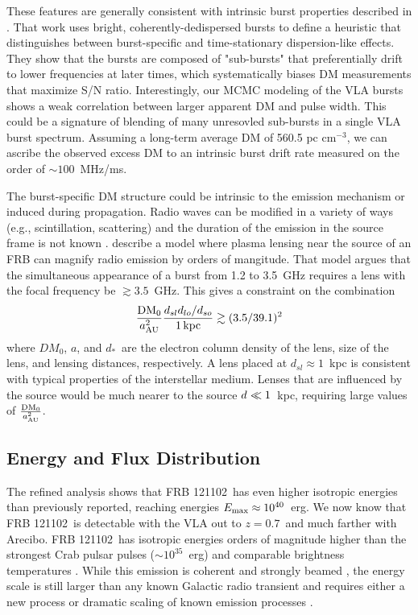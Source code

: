 \documentclass[twocolumn]{aastex61}
\newcommand{\frb}{FRB 121102}
\begin{document}
These features are generally consistent with intrinsic burst properties described in \citet{WEIRD}. That work uses bright, coherently-dedispersed bursts to define a heuristic that distinguishes between burst-specific and time-stationary dispersion-like effects. They show that the bursts are composed of "sub-bursts" that preferentially drift to lower frequencies at later times, which systematically biases DM measurements that maximize S/N ratio. Interestingly, our MCMC modeling of the VLA bursts shows a weak correlation between larger apparent DM and pulse width. This could be a signature of blending of many unresovled sub-bursts in a single VLA burst spectrum. Assuming a long-term average DM of 560.5 pc cm$^{-3}$, we can ascribe the observed excess DM to an intrinsic burst drift rate measured on the order of $\sim100$~MHz/ms.

The burst-specific DM structure could be intrinsic to the emission mechanism or induced during propagation. Radio waves can be modified in a variety of ways (e.g., scintillation, scattering) and the duration of the emission in the source frame is not known \citep{2016arXiv160505890C}. \citet{CORDES} describe a model where plasma lensing near the source of an FRB can magnify radio emission by orders of mangitude. That model argues that the simultaneous appearance of a burst from 1.2 to 3.5~GHz requires a lens with the focal frequency be $\gtrsim 3.5$~GHz. This gives a constraint on the combination 
$$\frac{\rm DM_0}{a_{\rm AU}^2} \frac{d_{sl}d_{lo}/d_{so}}{1\, \rm kpc} \gtrsim (3.5 / 39.1)^2$$
where $DM_0$, $a$, and $d_*$\ are the electron column density of the lens, size of the lens, and lensing distances, respectively. A lens placed at $d_{sl}\approx1$~kpc is consistent with typical properties of the interstellar medium. Lenses that are influenced by the source would be much nearer to the source $d_{\sl} \ll 1$~kpc, requiring large values of $\frac{\rm DM_0}{a_{\rm AU}^2}$.

\subsection{Energy and Flux Distribution}
The refined analysis shows that \frb\ has even higher isotropic energies than previously reported, reaching energies $E_{\rm{max}}\approx10^{40}$\ erg. We now know that \frb\ is detectable with the VLA out to $z=0.7$\ and much farther with Arecibo. \frb\ has isotropic energies orders of magnitude higher than the strongest Crab pulsar pulses ($\sim10^{35}$~erg) and comparable brightness temperatures \citep[$T_b^{\rm{Crab}}\sim10^{41}$~K versus $T_b^{\rm{FRB 121102}}\sim10^{38}$~K;][]{2003Natur.422..141H,2014PhRvD..89j3009K}. While this emission is coherent and strongly beamed \citep{2016Natur.531..202S, WEIRD}, the energy scale is still larger than any known Galactic radio transient and requires either a new process or dramatic scaling of known emission processes \citep{2016MNRAS.462..941L, 2016MNRAS.457..232C}.
\end{document}
